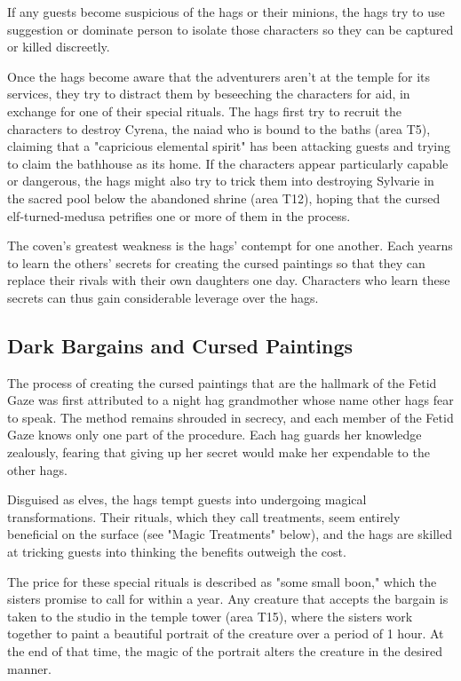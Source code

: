\documentclass[10pt,a4paper,twoside,bg=print,twocolumn,openany,nodeprecatedcode]{dndbook}
\begin{document}
If any guests become suspicious of the hags or their minions, the hags try to use suggestion or dominate person to isolate those characters so they can be captured or killed discreetly.

Once the hags become aware that the adventurers aren't at the temple for its services, they try to distract them by beseeching the characters for aid, in exchange for one of their special rituals. The hags first try to recruit the characters to destroy Cyrena, the naiad who is bound to the baths (area T5), claiming that a "capricious elemental spirit" has been attacking guests and trying to claim the bathhouse as its home. If the characters appear particularly capable or dangerous, the hags might also try to trick them into destroying Sylvarie in the sacred pool below the abandoned shrine (area T12), hoping that the cursed elf-turned-medusa petrifies one or more of them in the process.

The coven's greatest weakness is the hags' contempt for one another. Each yearns to learn the others' secrets for creating the cursed paintings so that they can replace their rivals with their own daughters one day. Characters who learn these secrets can thus gain considerable leverage over the hags.

\subsection{Dark Bargains and Cursed Paintings}
The process of creating the cursed paintings that are the hallmark of the Fetid Gaze was first attributed to a night hag grandmother whose name other hags fear to speak. The method remains shrouded in secrecy, and each member of the Fetid Gaze knows only one part of the procedure. Each hag guards her knowledge zealously, fearing that giving up her secret would make her expendable to the other hags.

Disguised as elves, the hags tempt guests into undergoing magical transformations. Their rituals, which they call treatments, seem entirely beneficial on the surface (see "Magic Treatments" below), and the hags are skilled at tricking guests into thinking the benefits outweigh the cost.

The price for these special rituals is described as "some small boon," which the sisters promise to call for within a year. Any creature that accepts the bargain is taken to the studio in the temple tower (area T15), where the sisters work together to paint a beautiful portrait of the creature over a period of 1 hour. At the end of that time, the magic of the portrait alters the creature in the desired manner.
\end{document}
